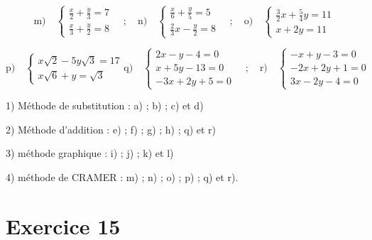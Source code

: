 \documentclass[12pt]{article}
\begin{document}
\[
\text{m)} \quad
\begin{cases}
\frac{x}{2} + \frac{y}{3} = 7 \\
\frac{x}{3} + \frac{y}{2} = 8
\end{cases}
\quad ; \quad
\text{n)} \quad
\begin{cases}
\frac{x}{6} + \frac{y}{5} = 5 \\
\frac{2}{3} x - \frac{y}{2}= 8
\end{cases}
\quad ; \quad
\text{o)} \quad
\begin{cases}
\frac{3}{2}x + \frac{5}{4}y = 11 \\
x + 2y = 11
\end{cases}
\]

\[
\text{p)} \quad
\begin{cases}
x\sqrt{2} - 5y\sqrt{3} = 17 \\
x\sqrt{6} + y = \sqrt{3}
\end{cases}
\text{q)} \quad
\begin{cases}
2x - y - 4 = 0 \\
x + 5y - 13 = 0 \\
-3x + 2y + 5 = 0
\end{cases}
\quad ; \quad
\text{r)} \quad
\begin{cases}
-x + y - 3 = 0 \\
-2x + 2y + 1 = 0 \\
3x - 2y - 4 = 0
\end{cases}
\]

1) Méthode de substitution : a) ; b) ; c) et d) 

2) Méthode d’addition : e) ; f) ; g) ; h) ; q) et r)

3) méthode graphique : i) ; j) ; k) et l)

4) méthode de CRAMER : m) ; n) ; o) ; p) ; q) et r).
\section*{Exercice 15}
\end{document}
